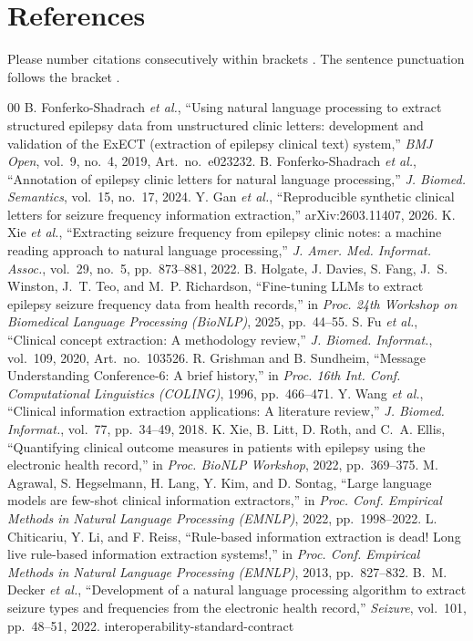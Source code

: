 \documentclass[conference]{IEEEtran}
\begin{document}
\section*{References}

Please number citations consecutively within brackets \cite{b1}. The 
sentence punctuation follows the bracket \cite{b2}. 

\begin{thebibliography}{00}
 B. Fonferko-Shadrach \emph{et al.}, ``Using natural language processing to extract structured epilepsy data from unstructured clinic letters: development and validation of the ExECT (extraction of epilepsy clinical text) system,'' \emph{BMJ Open}, vol.~9, no.~4, 2019, Art.~no.~e023232.
 B. Fonferko-Shadrach \emph{et al.}, ``Annotation of epilepsy clinic letters for natural language processing,'' \emph{J. Biomed. Semantics}, vol.~15, no.~17, 2024.
 Y. Gan \emph{et al.}, ``Reproducible synthetic clinical letters for seizure frequency information extraction,'' arXiv:2603.11407, 2026.
 K. Xie \emph{et al.}, ``Extracting seizure frequency from epilepsy clinic notes: a machine reading approach to natural language processing,'' \emph{J. Amer. Med. Informat. Assoc.}, vol.~29, no.~5, pp.~873--881, 2022.
 B. Holgate, J. Davies, S. Fang, J.~S. Winston, J.~T. Teo, and M.~P. Richardson, ``Fine-tuning LLMs to extract epilepsy seizure frequency data from health records,'' in \emph{Proc. 24th Workshop on Biomedical Language Processing (BioNLP)}, 2025, pp.~44--55.
 S. Fu \emph{et al.}, ``Clinical concept extraction: A methodology review,'' \emph{J. Biomed. Informat.}, vol.~109, 2020, Art.~no.~103526.
 R. Grishman and B. Sundheim, ``Message Understanding Conference-6: A brief history,'' in \emph{Proc. 16th Int. Conf. Computational Linguistics (COLING)}, 1996, pp.~466--471.
 Y. Wang \emph{et al.}, ``Clinical information extraction applications: A literature review,'' \emph{J. Biomed. Informat.}, vol.~77, pp.~34--49, 2018.
 K. Xie, B. Litt, D. Roth, and C.~A. Ellis, ``Quantifying clinical outcome measures in patients with epilepsy using the electronic health record,'' in \emph{Proc. BioNLP Workshop}, 2022, pp.~369--375.
 M. Agrawal, S. Hegselmann, H. Lang, Y. Kim, and D. Sontag, ``Large language models are few-shot clinical information extractors,'' in \emph{Proc. Conf. Empirical Methods in Natural Language Processing (EMNLP)}, 2022, pp.~1998--2022.
 L. Chiticariu, Y. Li, and F. Reiss, ``Rule-based information extraction is dead! Long live rule-based information extraction systems!,'' in \emph{Proc. Conf. Empirical Methods in Natural Language Processing (EMNLP)}, 2013, pp.~827--832.
 B.~M. Decker \emph{et al.}, ``Development of a natural language processing algorithm to extract seizure types and frequencies from the electronic health record,'' \emph{Seizure}, vol.~101, pp.~48--51, 2022.
 interoperability-standard-contract
\end{thebibliography}
\end{document}
